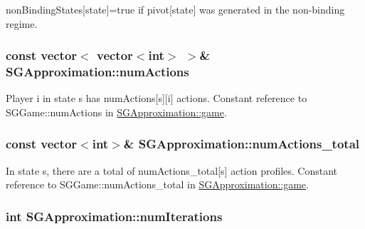 non\+Binding\+States\mbox{[}state\mbox{]}=true if pivot\mbox{[}state\mbox{]} was generated in the non-\/binding regime. \hypertarget{class_s_g_approximation_af6ee6afd52c29d6c81f29a4e35c40771}{
\subsubsection[{num\+Actions}]{\setlength{\rightskip}{0pt plus 5cm}const vector$<$ vector$<$int$>$ $>$\& S\+G\+Approximation\+::num\+Actions\hspace{0.3cm}{\ttfamily [private]}}}\label{class_s_g_approximation_af6ee6afd52c29d6c81f29a4e35c40771}
Player i in state s has num\+Actions\mbox{[}s\mbox{]}\mbox{[}i\mbox{]} actions. Constant reference to S\+G\+Game\+::num\+Actions in \hyperlink{class_s_g_approximation_a3244a3d7de5f2b909d438f5b4ab337ee}{S\+G\+Approximation\+::game}. \hypertarget{class_s_g_approximation_abcd0b34194cd55fca5361bb1c6d3a5e3}{
\subsubsection[{num\+Actions\+\_\+total}]{\setlength{\rightskip}{0pt plus 5cm}const vector$<$int$>$\& S\+G\+Approximation\+::num\+Actions\+\_\+total\hspace{0.3cm}{\ttfamily [private]}}}\label{class_s_g_approximation_abcd0b34194cd55fca5361bb1c6d3a5e3}
In state s, there are a total of num\+Actions\+\_\+total\mbox{[}s\mbox{]} action profiles. Constant reference to S\+G\+Game\+::num\+Actions\+\_\+total in \hyperlink{class_s_g_approximation_a3244a3d7de5f2b909d438f5b4ab337ee}{S\+G\+Approximation\+::game}. \hypertarget{class_s_g_approximation_a2898a820d159794c48e5611ee3937ca8}{
\subsubsection[{num\+Iterations}]{\setlength{\rightskip}{0pt plus 5cm}int S\+G\+Approximation\+::num\+Iterations\hspace{0.3cm}{\ttfamily [private]}}}\label{class_s_g_approximation_a2898a820d159794c48e5611ee3937ca8}
